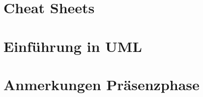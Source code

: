 \begin{appendices}
    \part{Cheat Sheets}
    
    \part{Einführung in UML}
    
    \part{Anmerkungen Präsenzphase}
    
\end{appendices}
